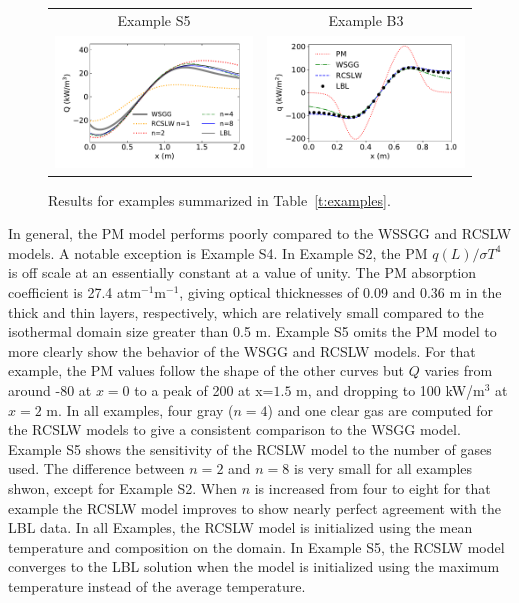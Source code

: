 \documentclass[preprint,12pt, a4paper]{elsarticle}
\begin{document}
\begin{figure}
\begin{center}
\begin{tabular}{c c}
        Example S5 & Example B3 \\
        \includegraphics[width=2.75 in]{ex_5b.pdf} &
        \includegraphics[width=2.75 in]{ex_6.pdf}
    \end{tabular}
    \caption{Results for examples summarized in Table~\ref{t:examples}.}
    \label{f:examples}
    \end{center}
\end{figure}
%
In general, the PM model performs poorly compared to the WSSGG and RCSLW models. A notable exception is Example S4. In Example S2, the PM $q(L)/\sigma T^4$ is off scale at an essentially constant at a value of unity. The PM absorption coefficient is 27.4 atm$^{-1}$m$^{-1}$, giving optical thicknesses of 0.09 and 0.36 m in the thick and thin layers, respectively, which are relatively small compared to the isothermal domain size greater than 0.5 m. Example S5 omits the PM model to more clearly show the behavior of the WSGG and RCSLW models. For that example, the PM values follow the shape of the other curves but $Q$ varies from around -80 at $x=0$ to a peak of 200 at x=$1.5$ m, and dropping to 100 kW/m$^3$ at $x=2$ m. In all examples, four gray ($n=4$) and one clear gas are computed for the RCSLW models to give a consistent comparison to the WSGG model. Example S5 shows the sensitivity of the RCSLW model to the number of gases used. The difference between $n=2$ and $n=8$ is very small for all examples shwon, except for Example S2. When $n$ is increased from four to eight for that example the RCSLW model improves to show nearly perfect agreement with the LBL data.
In all Examples, the RCSLW model is initialized using the mean temperature and composition on the domain. In Example S5, the RCSLW model converges to the LBL solution when the model is initialized using the maximum temperature instead of the average temperature.
\end{document}

